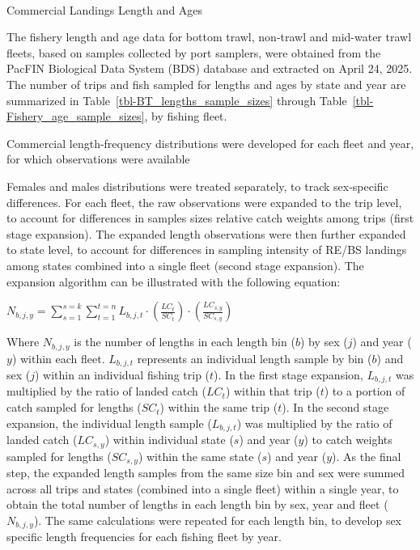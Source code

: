 \documentclass[
]{scrartcl}
\makeatletter
\let\oldparagraph\paragraph
\renewcommand{\paragraph}{
    \@ifstar
      \xxxParagraphStar
      \xxxParagraphNoStar
  }
\newcommand{\xxxParagraphStar}[1]{\oldparagraph*{#1}\mbox{}}
\newcommand{\xxxParagraphNoStar}[1]{\oldparagraph{#1}\mbox{}}
\makeatother
\begin{document}
\paragraph{Commercial Landings Length and
Ages}\label{commercial-landings-length-and-ages}

The fishery length and age data for bottom trawl, non-trawl and
mid-water trawl fleets, based on samples collected by port samplers,
were obtained from the PacFIN Biological Data System (BDS) database and
extracted on April 24, 2025. The number of trips and fish sampled for
lengths and ages by state and year are summarized in
Table~\ref{tbl-BT_lengths_sample_sizes} through
Table~\ref{tbl-Fishery_age_sample_sizes}, by fishing fleet.

Commercial length-frequency distributions were developed for each fleet
and year, for which observations were available

Females and males distributions were treated separately, to track
sex-specific differences. For each fleet, the raw observations were
expanded to the trip level, to account for differences in samples sizes
relative catch weights among trips (first stage expansion). The expanded
length observations were then further expanded to state level, to
account for differences in sampling intensity of RE/BS landings among
states combined into a single fleet (second stage expansion). The
expansion algorithm can be illustrated with the following equation:

\begin{centering}

$N_{b,j,y} = \displaystyle\sum_{s=1}^{s=k}\displaystyle\sum_{t=1}^{t=n}L_{b,j,t} \cdot
\left(\frac{LC_t}{SC_t}\right) \cdot \left(\frac{LC_{s,y}}{SC_{s,y}}\right)$

\end{centering}

Where \(N_{b,j,y}\) is the number of lengths in each length bin (\(b\))
by sex (\(j\)) and year (\(y\)) within each fleet. \(L_{b,j,t}\)
represents an individual length sample by bin (\(b\)) and sex (\(j\))
within an individual fishing trip (\(t\)). In the first stage expansion,
\(L_{b,j,t}\) was multiplied by the ratio of landed catch (\(LC_t\))
within that trip (\(t\)) to a portion of catch sampled for lengths
(\(SC_t\)) within the same trip (\(t\)). In the second stage expansion,
the individual length sample (\(L_{b,j,t}\)) was multiplied by the ratio
of landed catch (\(LC_{s,y}\)) within individual state (\(s\)) and year
(\(y\)) to catch weights sampled for lengths (\(SC_{s,y}\)) within the
same state (\(s\)) and year (\(y\)). As the final step, the expanded
length samples from the same size bin and sex were summed across all
trips and states (combined into a single fleet) within a single year, to
obtain the total number of lengths in each length bin by sex, year and
fleet (\(N_{b,j,y}\)). The same calculations were repeated for each
length bin, to develop sex specific length frequencies for each fishing
fleet by year.
\end{document}

